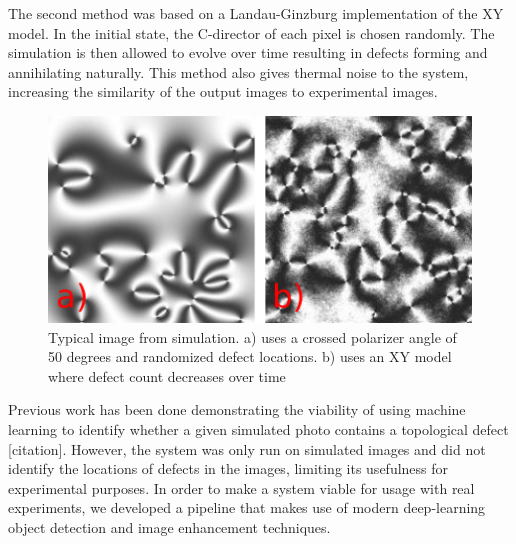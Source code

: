 \documentclass[prl,reprint,showpacs,floatfix,nofootinbib]{revtex4-1}
\begin{document}

The second method was based on a Landau-Ginzburg implementation of the XY model. In the initial state, the C-director of each pixel is chosen randomly. The simulation is then allowed to evolve over time resulting in defects forming and annihilating naturally. This method also gives thermal noise to the system, increasing the similarity of the output images to experimental images.


\begin{figure}
  \includegraphics[width=\linewidth]{simulations.png}
  \caption{Typical image from simulation. a) uses a crossed polarizer angle of 50 degrees and randomized defect locations. b) uses an XY model where defect count decreases over time}
  \label{fig:RandomDefect}
\end{figure}

Previous work has been done demonstrating the viability of using machine learning to identify whether a given simulated photo contains a topological defect [citation]. However, the system was only run on simulated images and did not identify the locations of defects in the images, limiting its usefulness for experimental purposes. In order to make a system viable for usage with real experiments, we developed a pipeline that makes use of modern deep-learning object detection and image enhancement techniques. 
\end{document}
